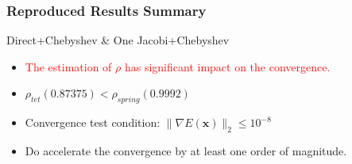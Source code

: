 \documentclass[serif,mathserif]{beamer}
\newcommand{\BOLD}[1]{\mathbf{#1}}
\newcommand{\TODO}[1]{\textcolor{red}{#1}}
\begin{document}
\begin{frame}
 \frametitle{Reproduced Results Summary}
  Direct+Chebyshev \& One Jacobi+Chebyshev
  \begin{itemize}
    \item \TODO{The estimation of $\rho$ has significant impact on the convergence.}
    \item $\rho_{tet}(0.87375) < \rho_{spring}(0.9992)$
    \pause
    \pause
    \item Convergence test condition: $\|\nabla E(\BOLD{x})\|_2 \le 10^{-8}$
    \item Do accelerate the convergence by at least one order of magnitude.

\end{itemize}
\end{frame}
\end{document}

